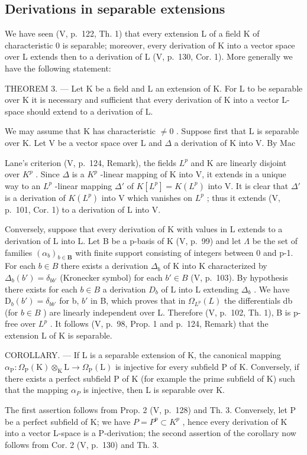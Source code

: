 \subsection{Derivations in separable extensions}

We have seen (V, p.~122, Th. 1) that every extension L of a field K of characteristic 0 is separable; moreover, every derivation of K into a vector space over L extends then to a derivation of L (V, p.~130, Cor. 1). More generally we have the following statement:

THEOREM 3. --- Let K be a field and L an extension of K. For L to be separable over K it is necessary and sufficient that every derivation of K into a vector L-space should extend to a derivation of L.

We may assume that K has characteristic \(\neq0\) . Suppose first that L is separable over K. Let V be a vector space over L and \(\Delta\) a derivation of K into V. By Mac

Lane's criterion (V, p.~124, Remark), the fields \(L^p\) and K are linearly disjoint over \(K^p\) . Since \(\Delta\) is a \(K^p\) -linear mapping of K into V, it extends in a unique way to an \(L^p\) -linear mapping \(\Delta'\) of \(K[L^p] = K(L^p)\) into V. It is clear that \(\Delta'\) is a derivation of \(K(L^p)\) into V which vanishes on \(L^p\) ; thus it extends (V, p.~101, Cor. 1) to a derivation of L into V.

Conversely, suppose that every derivation of K with values in L extends to a derivation of L into L. Let B be a p-basis of K (V, p.~99) and let \(\Lambda\) be the set of families \((\alpha_{b})_{b\in\mathbf{B}}\) with finite support consisting of integers between 0 and p-1. For each \(b\in B\) there exists a derivation \(\Delta_{b}\) of K into K characterized by \(\Delta_{b}(b')=\delta_{bb'}\) (Kronecker symbol) for each \(b'\in B\) (V, p.~103). By hypothesis there exists for each \(b\in B\) a derivation \(D_{b}\) of L into L extending \(\Delta_{b}\) . We have \(\mathrm{D}_{b}(b')=\delta_{bb'}\) for b, \(b'\) in B, which proves that in \(\Omega_{L^{p}}(L)\) the differentials db (for \(b\in B\) ) are linearly independent over L. Therefore (V, p.~102, Th. 1), B is p-free over \(L^{p}\) . It follows (V, p.~98, Prop. 1 and p.~124, Remark) that the extension L of K is separable.

COROLLARY. --- If L is a separable extension of K, the canonical mapping \(\alpha_{\mathrm{P}}:\Omega_{\mathrm{P}}(\mathrm{K})\otimes_{\mathrm{K}}\mathrm{L}\to\Omega_{\mathrm{P}}(\mathrm{L})\) is injective for every subfield P of K. Conversely, if there exists a perfect subfield P of K (for example the prime subfield of K) such that the mapping \(\alpha_{P}\) is injective, then L is separable over K.

The first assertion follows from Prop. 2 (V, p.~128) and Th. 3. Conversely, let P be a perfect subfield of K; we have \(P = P^{p} \subset K^{p}\) , hence every derivation of K into a vector L-space is a P-derivation; the second assertion of the corollary now follows from Cor. 2 (V, p.~130) and Th. 3.


